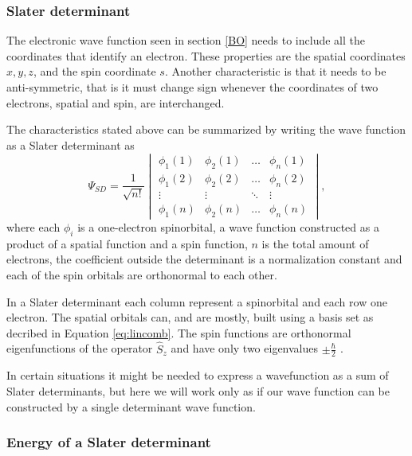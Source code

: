 \documentclass[../master_thesis.tex]{subfiles}
\begin{document}
\subsubsection{Slater determinant}
The electronic wave function seen in section \ref{BO} needs to include all the
coordinates that identify an electron. These properties are the spatial coordinates
$x, y, z$, and the spin coordinate $s$. Another characteristic is that
it needs to be anti-symmetric, that is it must change sign whenever the coordinates
of two electrons, spatial and spin, are interchanged.

The characteristics stated above can be summarized by writing the wave function as
a Slater determinant as \cite{Cramer:2004, Jensen:1999}
\begin{equation}
  \Psi_{SD} = \frac{1}{\sqrt{n!}}
  \begin{vmatrix}
    \phi_1(1) & \phi_2(1) & \ldots & \phi_n(1)\\
    \phi_1(2) & \phi_2(2) & \ldots & \phi_n(2)\\
    \vdots & \vdots & \ddots & \vdots \\
    \phi_1(n) & \phi_2(n) & \ldots & \phi_n(n)
  \end{vmatrix},
\end{equation}
where each $\phi_i$ is a one-electron spinorbital, a wave function constructed as
a product of a spatial function and a spin function\cite{Jensen:1999}, $n$ is the total amount of
electrons, the coefficient outside the determinant is a normalization constant
and each of the spin orbitals are orthonormal to each other.

In a Slater determinant each column represent a spinorbital and each row one electron.
The spatial orbitals can, and are mostly, built using a basis set as decribed in
Equation \ref{eq:lincomb}. The spin functions are orthonormal eigenfunctions of the operator $\hat{S}_z$
and have only two eigenvalues $\pm \frac{\hbar}{2}$ \cite{Cramer:2004}.

In certain situations it might be needed to express a wavefunction as a sum of Slater
determinants, but here we will work only as if our wave function can be constructed by
a single determinant wave function.

\subsubsection{Energy of a Slater determinant}
\end{document}
